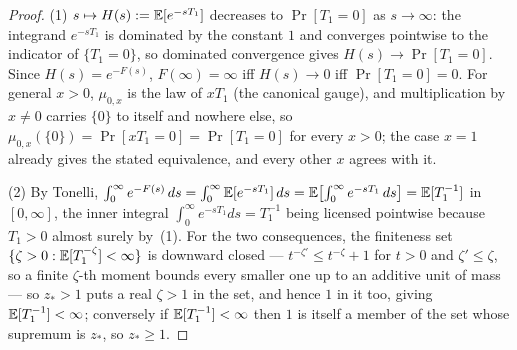 \begin{proof}
\leanok
(1) $s \mapsto H(s) := \mathbb{E}[e^{-sT_1}]$ decreases to $\Pr[T_1 = 0]$ as $s \to \infty$: the
integrand $e^{-sT_1}$ is dominated by the constant $1$ and converges pointwise to the indicator
of $\{T_1 = 0\}$, so dominated convergence gives $H(s) \to \Pr[T_1=0]$. Since $H(s) = e^{-F(s)}$,
$F(\infty) = \infty$ iff $H(s) \to 0$ iff $\Pr[T_1 = 0] = 0$. For general $x > 0$, $\mu_{0,x}$ is
the law of $xT_1$ (the canonical gauge), and multiplication by $x \ne 0$ carries $\{0\}$ to
itself and nowhere else, so $\mu_{0,x}(\{0\}) = \Pr[xT_1 = 0] = \Pr[T_1 = 0]$ for every $x > 0$;
the case $x=1$ already gives the stated equivalence, and every other $x$ agrees with it.

(2) By Tonelli, $\int_0^\infty e^{-F(s)}\,ds = \int_0^\infty \mathbb{E}[e^{-sT_1}]\,ds =
\mathbb{E}\bigl[\int_0^\infty e^{-sT_1}\,ds\bigr] = \mathbb{E}[T_1^{-1}]$ in $[0,\infty]$, the inner integral
$\int_0^\infty e^{-sT_1}ds = T_1^{-1}$ being licensed pointwise because $T_1 > 0$ almost surely
by~(1). For the two consequences, the finiteness set
$\{\zeta > 0 : \mathbb{E}[T_1^{-\zeta}] < \infty\}$ is downward closed --- $t^{-\zeta'} \le
t^{-\zeta} + 1$ for $t > 0$ and $\zeta' \le \zeta$, so a finite $\zeta$-th moment bounds every
smaller one up to an additive unit of mass --- so $z_* > 1$ puts a real $\zeta > 1$ in the set,
and hence $1$ in it too, giving $\mathbb{E}[T_1^{-1}] < \infty$; conversely if $\mathbb{E}[T_1^{-1}] < \infty$
then $1$ is itself a member of the set whose supremum is $z_*$, so $z_* \ge 1$.
\end{proof}

